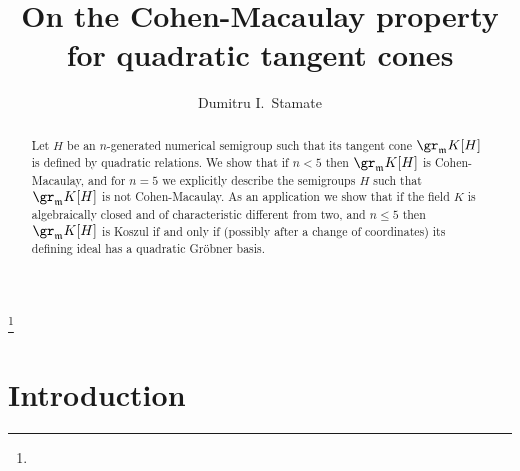 \documentclass[12pt]{amsart}
\def\frk{\mathfrak}               %
\def\mm{{\frk m}}
\begin{document}
\title {On the Cohen-Macaulay property for quadratic tangent cones}

 \author {Dumitru I.\ Stamate}

 

\address{Dumitru I. Stamate, Faculty of Mathematics and Computer Science, University of Bucharest, Str. Academiei 14, Bucharest, Romania, and  \newline  \indent
Simion Stoilow Institute of Mathematics of the Romanian Academy, Research group
of the project PN-II-RU-PD-2012-3-0656, P.O.Box 1-764, Bucharest 014700, Romania}


\dedicatory{ }

\begin{abstract}
Let $H$ be an $n$-generated numerical semigroup such that its tangent cone $\gr_\mm K[H]$ is defined by quadratic relations.
We show that  if $n<5$ then $\gr_\mm K[H]$ is Cohen-Macaulay, and for $n=5$ we explicitly describe the   semigroups $H$  such that   $\gr_\mm K[H]$ is not Cohen-Macaulay.
As an application we show that if the field $K$ is algebraically closed  and of characteristic different from two, and $n\leq 5$ then $\gr_\mm K[H]$ is Koszul 
if and only if (possibly after a change of coordinates) its defining ideal has a quadratic Gr\"obner basis. 
\end{abstract}

\thanks{}
 


\maketitle



\section*{Introduction}
\end{document}

